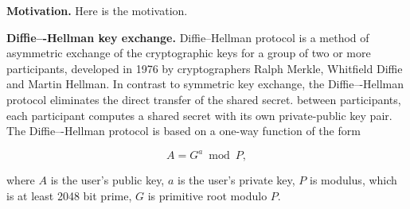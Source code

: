 \textbf{Motivation.} Here is the motivation.

\textbf{Diffie–-Hellman key exchange.} Diffie--Hellman protocol is a method of asymmetric exchange
of the cryptographic keys for a group of two or more participants,
developed in 1976 by cryptographers Ralph Merkle, Whitfield Diffie and Martin Hellman.
In contrast to symmetric key exchange, the Diffie–-Hellman protocol eliminates the direct transfer of the shared secret.
between participants, each participant computes a shared secret with its own private-public key pair.
The Diffie–-Hellman protocol is based on a one-way function of the form

\[
    A = G ^ a \bmod P,
\]

where $A$ is the user's public key, $a$ is the user's private key, $P$ is modulus, which is at least 2048 bit prime,
$G$ is primitive root modulo $P$.

